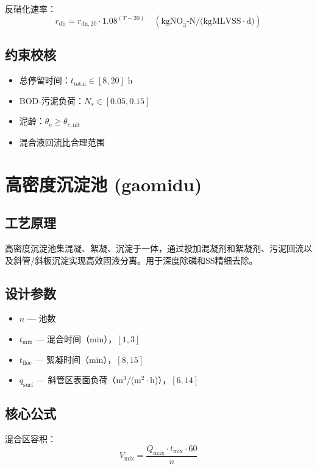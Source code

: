 \documentclass[12pt,a4paper]{ctexart}
\begin{document}
反硝化速率：
\begin{equation}
r_{\text{dn}} = r_{\text{dn},20} \cdot 1.08^{(T-20)} \quad (\text{kgNO}_3\text{-N/(kgMLVSS}\cdot\text{d)})
\end{equation}

\subsection{约束校核}
\begin{itemize}
  \item 总停留时间：$t_{\text{total}} \in [8, 20]$ h
  \item BOD-污泥负荷：$N_s \in [0.05, 0.15]$
  \item 泥龄：$\theta_c \ge \theta_{c,\text{nit}}$
  \item 混合液回流比合理范围
\end{itemize}

\section{高密度沉淀池 (gaomidu)}

\subsection{工艺原理}
高密度沉淀池集混凝、絮凝、沉淀于一体，通过投加混凝剂和絮凝剂、污泥回流以及斜管/斜板沉淀实现高效固液分离。用于深度除磷和SS精细去除。

\subsection{设计参数}
\begin{itemize}
  \item $n$ — 池数
  \item $t_{\text{mix}}$ — 混合时间（min），$[1, 3]$
  \item $t_{\text{floc}}$ — 絮凝时间（min），$[8, 15]$
  \item $q_{\text{surf}}$ — 斜管区表面负荷（m$^3$/(m$^2\cdot$h)），$[6, 14]$
\end{itemize}

\subsection{核心公式}
混合区容积：
\begin{equation}
V_{\text{mix}} = \frac{Q_{\text{max}} \cdot t_{\text{mix}} \cdot 60}{n}
\end{equation}
\end{document}

